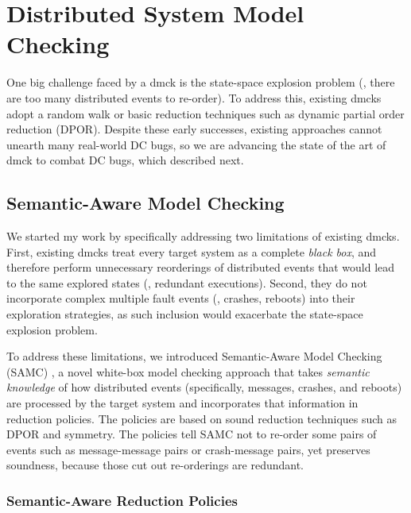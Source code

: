 \section{Distributed System Model Checking}

One big challenge faced by a dmck is the state-space explosion problem (\ie,
there are too many distributed events to re-order). To address this, existing
dmcks adopt a random walk or basic reduction techniques such as dynamic partial
order reduction (DPOR). Despite these early successes, existing approaches
cannot unearth many real-world DC bugs, so we are advancing the state of the art
of dmck to combat DC bugs, which described next.

\subsection{Semantic-Aware Model Checking}

We started my work by specifically addressing two limitations of existing dmcks.
First, existing dmcks treat every target system as a complete \textit{black
box}, and therefore perform unnecessary reorderings of distributed events that
would lead to the same explored states (\ie, redundant executions). Second, they
do not incorporate complex multiple fault events (\eg, crashes, reboots) into
their exploration strategies, as such inclusion would exacerbate the state-space
explosion problem.

To address these limitations, we introduced Semantic-Aware Model Checking (SAMC)
\cite{Leesatapornwongsa+15-SamcIssta, Leesatapornwongsa+14-Samc}, a novel
white-box model checking approach that takes \textit{semantic knowledge} of how
distributed events (specifically, messages, crashes, and reboots) are processed
by the target system and incorporates that information in reduction policies.
The policies are based on sound reduction techniques such as DPOR and symmetry.
The policies tell SAMC not to re-order some pairs of events such as
message-message pairs or crash-message pairs, yet preserves soundness, because
those cut out re-orderings are redundant.

\subsubsection{Semantic-Aware Reduction Policies}

